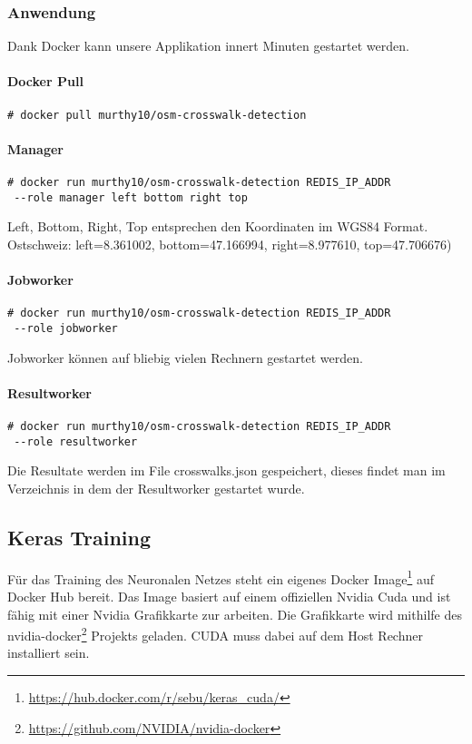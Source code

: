 \newpage
\subsubsection{Anwendung}
Dank Docker kann unsere Applikation innert Minuten gestartet werden.

\paragraph{Docker Pull}
\begin{lstlisting}[style=BashInputStyle]
	# docker pull murthy10/osm-crosswalk-detection
\end{lstlisting}

\paragraph{Manager}
\begin{lstlisting}[style=BashInputStyle]
 # docker run murthy10/osm-crosswalk-detection REDIS_IP_ADDR 
 --role manager left bottom right top
\end{lstlisting}
Left, Bottom, Right, Top entsprechen den Koordinaten im WGS84 Format. \\
Ostschweiz: left=8.361002, bottom=47.166994, right=8.977610, top=47.706676) 

\paragraph{Jobworker}
\begin{lstlisting}[style=BashInputStyle]
 # docker run murthy10/osm-crosswalk-detection REDIS_IP_ADDR 
 --role jobworker
\end{lstlisting}
Jobworker können auf bliebig vielen Rechnern gestartet werden.\\

\paragraph{Resultworker}
\begin{lstlisting}[style=BashInputStyle]
 # docker run murthy10/osm-crosswalk-detection REDIS_IP_ADDR 
 --role resultworker
\end{lstlisting}
Die Resultate werden im File crosswalks.json gespeichert, dieses findet man im Verzeichnis in dem der Resultworker gestartet wurde.
\newpage
\subsection{Keras Training}
Für das Training des Neuronalen Netzes steht ein eigenes Docker Image\footnote{\url{https://hub.docker.com/r/sebu/keras_cuda/}} auf Docker Hub bereit. Das Image basiert auf einem offiziellen Nvidia Cuda und ist fähig mit einer Nvidia Grafikkarte zur arbeiten. Die Grafikkarte wird mithilfe des nvidia-docker\footnote{\url{https://github.com/NVIDIA/nvidia-docker}} Projekts geladen. CUDA muss dabei auf dem Host Rechner installiert sein.


